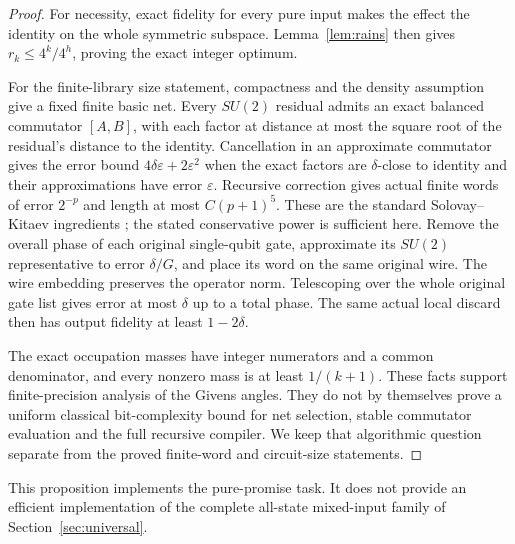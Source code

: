 \begin{proof}
For necessity, exact fidelity for every pure input makes the effect the identity on the whole symmetric subspace. Lemma~\ref{lem:rains} then gives $r_k\le4^k/4^h$, proving the exact integer optimum.

For the finite-library size statement, compactness and the density assumption give a fixed finite basic net. Every $SU(2)$ residual admits an exact balanced commutator $[A,B]$, with each factor at distance at most the square root of the residual's distance to the identity. Cancellation in an approximate commutator gives the error bound $4\delta\varepsilon+2\varepsilon^2$ when the exact factors are $\delta$-close to identity and their approximations have error $\varepsilon$. Recursive correction gives actual finite words of error $2^{-p}$ and length at most $C(p+1)^5$. These are the standard Solovay--Kitaev ingredients \cite{dawson}; the stated conservative power is sufficient here. Remove the overall phase of each original single-qubit gate, approximate its $SU(2)$ representative to error $\delta/G$, and place its word on the same original wire. The wire embedding preserves the operator norm. Telescoping over the whole original gate list gives error at most $\delta$ up to a total phase. The same actual local discard then has output fidelity at least $1-2\delta$.

The exact occupation masses have integer numerators and a common denominator, and every nonzero mass is at least $1/(k+1)$. These facts support finite-precision analysis of the Givens angles. They do not by themselves prove a uniform classical bit-complexity bound for net selection, stable commutator evaluation and the full recursive compiler. We keep that algorithmic question separate from the proved finite-word and circuit-size statements.
\end{proof}

This proposition implements the pure-promise task. It does not provide an efficient implementation of the complete all-state mixed-input family of Section~\ref{sec:universal}.

